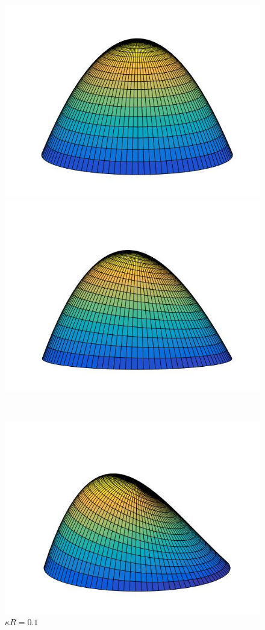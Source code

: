 \documentclass[a4paper]{report}
\begin{document}
\newpage
\begin{figure}[htbp]
\centering
\begin{minipage}[c]{.30\textwidth}
\includegraphics[width=.70\textwidth]{k0}
\caption{$\kappa R=0$}
\end{minipage}%
\hspace{10mm}%
\begin{minipage}[c]{.30\textwidth}
\includegraphics[width=.70\textwidth]{k01}
\caption{$\kappa R=0.1$}
\end{minipage}%
\\
\begin{minipage}[c]{.30\textwidth}
\includegraphics[width=.70\textwidth]{k03}

\end{minipage}
\end{figure}
\end{document}

